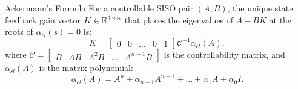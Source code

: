 \begin{mytheorem}{Ackermann's Formula}
For a controllable SISO pair $(A, B)$, the unique state feedback gain vector $K \in \mathbb{R}^{1 \times n}$ that places the eigenvalues of $A - B K$ at the roots of $\alpha_{cl}(s) = 0$ is:
\begin{equation}
    K = \begin{bmatrix} 0 & 0 & \dots & 0 & 1 \end{bmatrix} \mathcal{C}^{-1} \alpha_{cl}(A) , \label{eq:ackermann}
\end{equation}
where $\mathcal{C} = \begin{bmatrix} B & AB & A^2B & \dots & A^{n-1}B \end{bmatrix}$ is the controllability matrix, and $\alpha_{cl}(A)$ is the matrix polynomial:
\begin{equation}
\alpha_{cl}(A) = A^n + \alpha_{n-1} A^{n-1} + \dots + \alpha_1 A + \alpha_0 I .
\end{equation}
\end{mytheorem}

